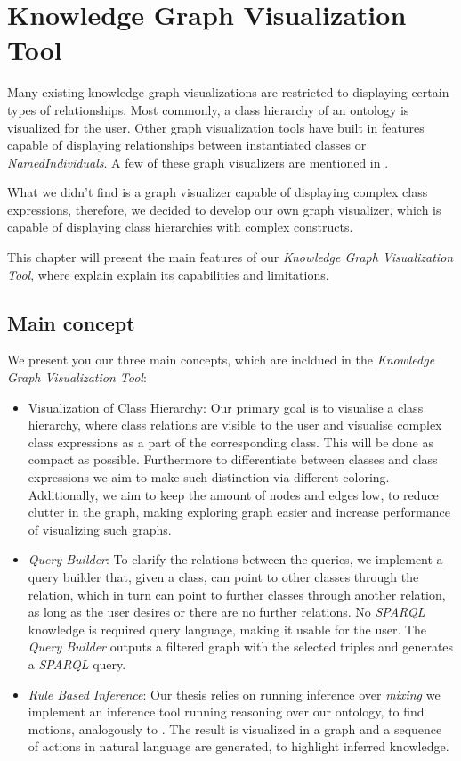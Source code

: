 \chapter{Knowledge Graph Visualization Tool}
\label{chap:OWLViz}
Many existing knowledge graph visualizations are restricted to displaying certain types of relationships. 
Most commonly, a class hierarchy of an ontology is visualized for the user. Other graph visualization tools have built in features capable of 
displaying relationships between instantiated classes or \textit{NamedIndividuals}.
A few of these graph visualizers are mentioned in .

What we didn't find is a graph visualizer capable of displaying complex class expressions, therefore, we decided to develop our own graph visualizer, 
which is capable of displaying class hierarchies with complex constructs.

This chapter will present the main features of our \textit{Knowledge Graph Visualization Tool}, where explain explain its capabilities and limitations.

\section{Main concept}
\label{sec:MainConceps}

We present you our three main concepts, which are incldued in the \textit{Knowledge Graph Visualization Tool}:
\begin{itemize}
    \item Visualization of Class Hierarchy: Our primary goal is to visualise a class hierarchy, where class relations are visible to the 
    user and visualise complex class expressions as a part of the corresponding class. This will be done as compact as possible. 
    Furthermore to differentiate between classes and class expressions we aim to make such distinction via different coloring. 
    Additionally, we aim to keep the amount of nodes and edges low, to reduce clutter in the graph, making exploring graph easier and 
    increase performance of visualizing such graphs.  
    \item \textit{Query Builder}: To clarify the relations between the queries, we implement a query builder that, given a class, can point to other classes through the relation, 
    which in turn can point to further classes through another relation, as long as the user desires or there are no further relations. 
    No \textit{SPARQL} knowledge is required query language, making it usable for the user. 
    The \textit{Query Builder} outputs a filtered graph with the selected triples and generates a \textit{SPARQL} query.
    \item \textit{Rule Based Inference}: Our thesis relies on running inference over \textit{mixing} 
    we implement an inference tool running reasoning over our ontology, to find motions, analogously to .
    The result is visualized in a graph and a sequence of actions in natural language are generated, to highlight inferred knowledge.  
\end{itemize}

